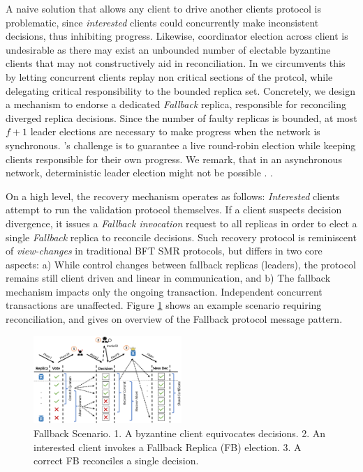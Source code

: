 A naive solution that allows any client to drive another clients protocol is problematic, since \textit{interested} clients could concurrently make inconsistent decisions, thus inhibiting progress. Likewise, coordinator election across client is undesirable as there may exist an unbounded number of electable byzantine clients that may not constructively aid in reconciliation. In \sys we circumvents this by letting concurrent clients replay non critical sections of the protcol, while delegating critical responsibility to the bounded replica set. Concretely, we design a mechanism to endorse a dedicated \textit{Fallback} replica, responsible for reconciling diverged replica decisions. Since the number of faulty replicas is bounded, at most $f+1$ leader elections are necessary to make progress when the network is synchronous. \sys{}'s challenge is to guarantee a live round-robin election while keeping clients responsible for their own progress. We remark, that in an asynchronous network, deterministic leader election might not be possible  \cite{fischer1985impossibility}.  .

On a high level, the recovery mechanism operates as follows: \textit{Interested} clients attempt to run the validation protocol themselves. If a client suspects decision divergence, it issues a \textit{Fallback invocation} request to all replicas in order to elect a single \textit{Fallback} replica to reconcile decisions. Such recovery protocol is reminiscent of \textit{view-changes} in traditional BFT SMR protocols, but differs in two core aspects: a) While control changes between fallback replicas (leaders), the protocol remains still client driven and linear in communication, and b) The fallback mechanism impacts only the ongoing transaction. Independent concurrent transactions are unaffected. Figure \ref{fig:FigureFBnom} shows an example scenario requiring reconciliation, and gives on overview of the  Fallback protocol message pattern.

\begin{figure}
\begin{center}
\includegraphics[width= 0.5\textwidth]{./figures/FBNom.png}
\end{center}
\caption{Fallback Scenario. 1. A byzantine client equivocates decisions. 2. An interested client invokes a Fallback Replica (FB) election. 3. A correct FB reconciles a single decision.}
\label{fig:FigureFBnom}
\end{figure}


